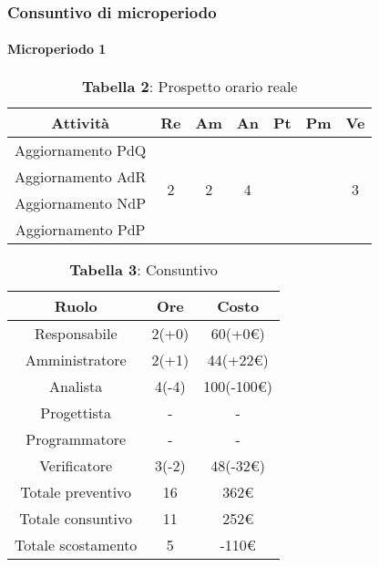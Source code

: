 \subsubsection{Consuntivo di microperiodo}
\paragraph{Microperiodo 1}
\begin{table}[H]
	\centering
	\begin{tabular}{|c|c|c|c|c|c|c|}
		\hline
		\rowcolor{lighter-grayer}
		\textbf{Attività} & \textbf{Re}        & \textbf{Am}        & \textbf{An}        & \textbf{Pt} & \textbf{Pm} & \textbf{Ve}        \\ \hline
		Aggiornamento PdQ & \multirow{4}{*}{2} & \multirow{4}{*}{2} & \multirow{4}{*}{4} &             &             & \multirow{4}{*}{3} \\ \cline{1-1} \cline{5-6}
		Aggiornamento AdR &                    &                    &                    &             &             &                    \\ \cline{1-1} \cline{5-6}
		Aggiornamento NdP &                    &                    &                    &             &             &                    \\ \cline{1-1} \cline{5-6}
		Aggiornamento PdP &                    &                    &                    &             &             &                    \\ \hline
	\end{tabular}
	\caption*{\textbf{Tabella 2}: Prospetto orario reale\\}
\end{table}

\begin{table}[H]
	\centering
	\renewcommand{\arraystretch}{1.5}
	\begin{tabular}{|c|c|c|}
		\hline
		\rowcolor{lighter-grayer}
		Ruolo & Ore & Costo \\ \hline
		Responsabile & 2(+0) & 60(+0\euro) \\ \hline
		Amministratore & 2(+1) & 44(+22\euro) \\ \hline
		Analista & 4(-4) & 100(-100\euro) \\ \hline
		Progettista & - & - \\ \hline
		Programmatore & - & - \\ \hline
		Verificatore & 3(-2) & 48(-32\euro) \\ \hline
		Totale preventivo & 16 & 362\euro \\ \hline
		Totale consuntivo & 11 & 252\euro \\ \hline
		Totale scostamento & 5 & -110\euro \\ \hline
	\end{tabular}
	\caption*{\textbf{Tabella 3}: Consuntivo\\}
\end{table}

